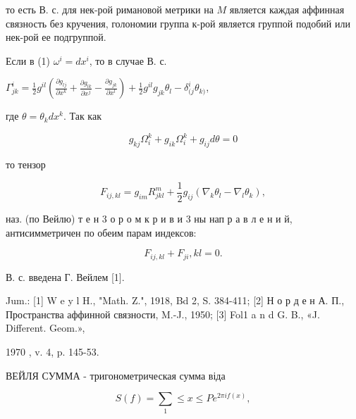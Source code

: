 \documentclass[10pt]{article}
\begin{document}
то есть В. с. для нек-рой римановой метрики на $M$ является каждая аффинная связность без кручения, голономии группа к-рой является группой подобий или нек-рой ее подгруппой.



Если в (1) $\omega^{i}=d x^{i}$, то в случае В. с.



$\Gamma_{j k}^{i}=\frac{1}{2} g^{i l}\left(\frac{\partial g_{l j}}{\partial x^{k}}+\frac{\partial g_{l k}}{\partial x^{j}}-\frac{\partial g_{j k}}{\partial x^{l}}\right)+\frac{1}{2} g^{i l} g_{j k} \theta_{l}-\delta_{(j}^{i} \theta_{k)}$,



где $\theta=\theta_{k} d x^{k}$. Так как



\[

g_{k j} \Omega_{i}^{k}+g_{i k} \Omega_{i}^{k}+g_{i j} d \theta=0

\]



то тензор



\[

F_{i j, k l}=g_{i m} R_{j k l}^{m}+\frac{1}{2} g_{i j}\left(\nabla_{k} \theta_{l}-\nabla_{l} \theta_{k}\right),

\]



наз. (по Вейлю) т е н 3 о р о м к р и в и 3 ны нап р а в л е н и й, антисимметричен по обеим парам индексов:



\[

F_{i j, k l}+F_{j i}, k l=0 .

\]



В. с. введена Г. Вейлем [1].



Jum.: [1] W e y l H., "Math. Z.", 1918, Bd 2, S. 384-411; [2] Н о р д е н А. П., Пространства аффинной связности, M.-J., 1950; [3] Fol1 a n d G. B., «J. Different. Geom.»,

1970 , v. 4, p. 145-53.



ВЕЙЛЯ СУММА - тригонометрическая сумма віда



\[

S(f)=\sum_{1} \leqslant x \leqslant P e^{2 \pi i f(x)},

\]
\end{document}
